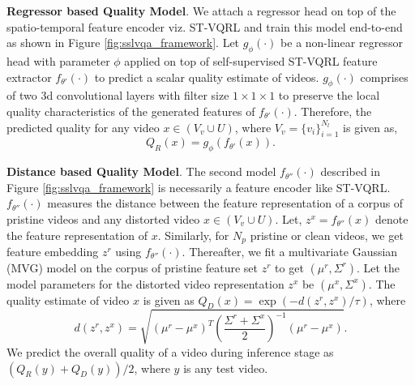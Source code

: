 \documentclass[10pt,twocolumn,letterpaper]{article}
\begin{document}
\textbf{Regressor based Quality Model}. We attach a regressor head on top of the spatio-temporal feature encoder viz. ST-VQRL and train this model end-to-end as shown in Figure \ref{fig:sslvqa_framework}. Let $g_\phi(\cdot)$ be a non-linear regressor head with parameter $\phi$ applied on top of self-supervised ST-VQRL feature extractor $f_{\theta'}(\cdot)$ to predict a scalar quality estimate of videos. $g_\phi(\cdot)$ comprises of two 3d convolutional layers with filter size $1\times 1\times 1$ to preserve the local quality characteristics of the generated features of $f_{\theta'}(\cdot)$. Therefore, the predicted quality for any video $x \in (V_v \cup U)$, where $V_v = \{v_i\}_{i=1}^{N_l}$ is given as,
\begin{equation*}
    Q_R(x) = g_\phi(f_{\theta'}(x)).
\end{equation*}

\textbf{Distance based Quality Model}. The second model $f_{\theta''}(\cdot)$ described in Figure \ref{fig:sslvqa_framework} is necessarily a feature encoder like ST-VQRL. $f_{\theta''}(\cdot)$  measures the distance between the feature representation of a corpus of pristine videos and any distorted video $x \in (V_v \cup U)$. Let, $z^x = f_{\theta''}(x)$ denote the feature representation of $x$. Similarly, for $N_p$ pristine or clean videos, we get feature embedding $z^r$ using $f_{\theta''}(\cdot)$. Thereafter, we fit a multivariate Gaussian (MVG) model on the corpus of pristine feature set $z^r$ to get $(\mu^r, \Sigma^r)$. Let the model parameters for the distorted video representation $z^x$ be $(\mu^x, \Sigma^x)$. The quality estimate of video $x$ is given as $Q_D(x) = \exp(-d(z^r,z^x)/\tau)$, where
\begin{equation*}
    d(z^r,z^x) = \sqrt{(\mu^r -\mu^x)^T \left(\frac{\Sigma^r +\Sigma^x}{2} \right)^{-1} (\mu^r - \mu^x)}.
\end{equation*}
We predict the overall quality of a video during inference stage as $(Q_R(y)+ Q_D(y))/2$, where $y$ is any test video.
\end{document}
